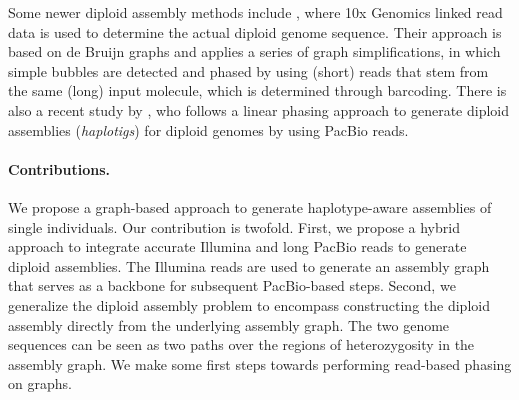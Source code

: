 Some newer diploid assembly methods include \cite{weisenfeld2017direct}, where 10x Genomics linked read data is used to determine the actual diploid genome sequence. 
Their approach is based on de Bruijn graphs and applies a series of graph simplifications, in which simple bubbles are detected and phased by using (short) reads that stem from the same (long) input molecule, which is determined through barcoding.
There is also a recent study by \cite{chin2016phased}, who follows a linear phasing approach to generate diploid assemblies (\textit{haplotigs}) for diploid genomes by using PacBio reads.

\paragraph{Contributions.}
We propose a graph-based approach to generate haplotype-aware assemblies of single individuals.
Our contribution is twofold. First, we propose a hybrid approach to integrate accurate Illumina and long PacBio reads to generate diploid assemblies. 
The Illumina reads are used to generate an assembly graph that serves as a backbone for subsequent PacBio-based steps.
Second, we generalize the diploid assembly problem to encompass constructing the diploid assembly directly from the underlying assembly graph.
The two genome sequences can be seen as two paths over the regions of heterozygosity in the assembly graph.
We make some first steps towards performing read-based phasing on graphs.


